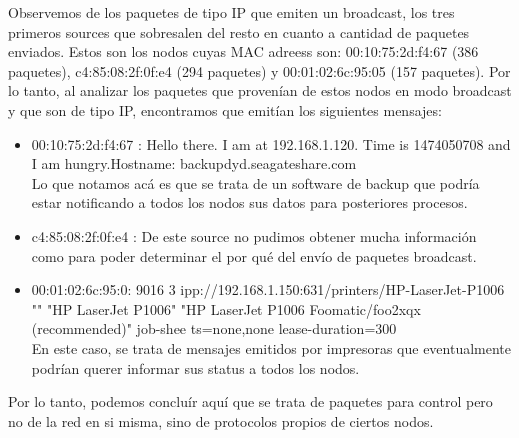 Observemos de los paquetes de tipo IP que emiten un broadcast, los tres primeros sources que sobresalen del resto en cuanto a cantidad de paquetes enviados. Estos son los nodos cuyas MAC adreess son: 00:10:75:2d:f4:67 (386 paquetes), c4:85:08:2f:0f:e4 (294 paquetes) y 00:01:02:6c:95:05 (157 paquetes).
Por lo tanto, al analizar los paquetes que provenían de estos nodos en modo broadcast y que son de tipo IP, encontramos que emitían los siguientes mensajes:

\begin{itemize}
	\item 00:10:75:2d:f4:67	: Hello there. I am at 192.168.1.120. Time is 1474050708 and I am hungry.Hostname: backupdyd.seagateshare.com \\
		Lo que notamos ac\'a es que se trata de un software de backup que podr\'ia estar notificando a todos los nodos sus datos para posteriores procesos.
	\item c4:85:08:2f:0f:e4	: De este source no pudimos obtener mucha informaci\'on como para poder determinar el por qu\'e del env\'io de paquetes broadcast.
	\item 00:01:02:6c:95:0: 9016 3 ipp://192.168.1.150:631/printers/HP-LaserJet-P1006 "" "HP LaserJet P1006" "HP LaserJet P1006 Foomatic/foo2xqx (recommended)" job-shee    ts=none,none lease-duration=300 \\
		En este caso, se trata de mensajes emitidos por impresoras que eventualmente podr\'ian querer informar sus status a todos los nodos.
\end{itemize}

Por lo tanto, podemos conclu\'ir aqu\'i que se trata de paquetes para control pero no de la red en si misma, sino de protocolos propios de ciertos nodos.